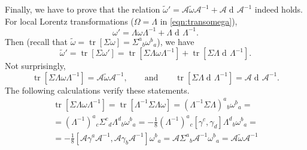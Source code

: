 \documentclass[a4paper,12pt]{book}
\newcommand{\dd}{\mathop{\mathrm{d}\!}{}}
\DeclareMathOperator\tr{tr}
\theoremstyle{definition}
\theoremstyle{remark}
\begin{document}
\begin{itemize}
Finally, we have to prove that the relation $\tilde\omega'=\mathcal A\tilde\omega\mathcal A^{-1}+\mathcal A\dd \mathcal A^{-1}$ indeed holds. For local Lorentz transformations ($\Omega=\Lambda$ in \cref{eqn:transomega}),
\[\omega'=\Lambda\omega\Lambda^{-1}+\Lambda\dd\Lambda^{-1}.\]
Then (recall that $\tilde\omega=\tr[\Sigma\omega]=\Sigma^a{}_b\omega^b{}_a$), we have
\[\tilde\omega'=\tr[\Sigma\omega']=\tr[\Sigma\Lambda\omega\Lambda^{-1}]+\tr[\Sigma\Lambda\dd\Lambda^{-1}].\]
Not surprisingly,
\[\tr[\Sigma\Lambda\omega\Lambda^{-1}]=\mathcal A\tilde\omega\mathcal A^{-1},\qquad\text{and}\qquad\tr[\Sigma\Lambda\dd\Lambda^{-1}]=\mathcal A\dd\mathcal A^{-1}.\]
The following calculations verify these statements.
\begin{multline*}
\tr[\Sigma\Lambda\omega\Lambda^{-1}]=\tr[\Lambda^{-1}\Sigma\Lambda\omega]=(\Lambda^{-1}\Sigma\Lambda)^a{}_b\omega^b{}_a=\\
=(\Lambda^{-1})^a{}_c\Sigma^c{}_d\Lambda^d{}_b\omega^b{}_a=-\frac{1}{8}(\Lambda^{-1})^a{}_c[\gamma^c,\gamma_d]\Lambda^d{}_b\omega^b{}_a=\\
=-\frac{1}{8}[\mathcal A\gamma^a\mathcal A^{-1},\mathcal A\gamma_b\mathcal A^{-1}]\omega^b{}_a=\mathcal A\Sigma^a{}_b\mathcal A^{-1}\omega^b{}_a=\mathcal A\tilde\omega\mathcal A^{-1}
\end{multline*}


\end{itemize}
\end{document}
